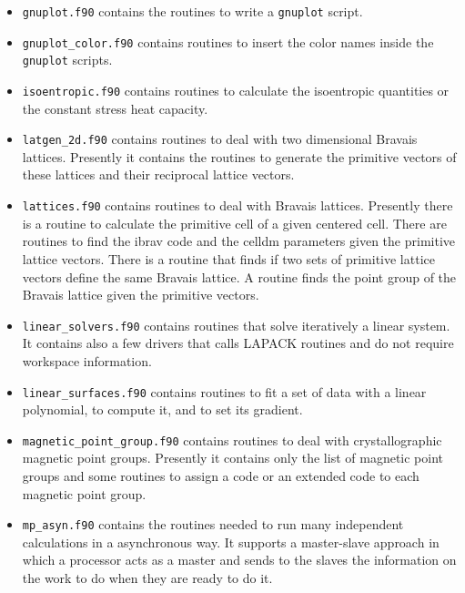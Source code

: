 \documentclass[12pt,a4paper]{article}
\begin{document}
\begin{itemize}
\item
\texttt{gnuplot.f90} contains the routines to write a \texttt{gnuplot} script.

\item
\texttt{gnuplot\_color.f90} contains routines to insert the color names
inside the \texttt{gnuplot} scripts.

\item
\texttt{isoentropic.f90} contains routines to calculate the isoentropic
quantities or the constant stress heat capacity.

\item
\texttt{latgen\_2d.f90} contains routines to deal with two dimensional
Bravais lattices. Presently it contains the routines to generate the
primitive vectors of these lattices and their reciprocal lattice vectors.

\item \texttt{lattices.f90} contains routines to deal with Bravais lattices.
Presently there is a routine to calculate the primitive cell of
a given centered cell. There are routines to find the ibrav code and the
celldm parameters given the primitive lattice vectors. There is a routine
that finds if two sets of primitive lattice vectors define the same 
Bravais lattice. A routine finds the point group of the Bravais lattice
given the primitive vectors.

\item
\texttt{linear\_solvers.f90} contains routines that solve iteratively
a linear system. It contains also a few drivers that calls LAPACK routines
and do not require workspace information. 

\item
\texttt{linear\_surfaces.f90} contains routines to fit a set of data
with a linear polynomial, to compute it, and to set its gradient.  

\item
\texttt{magnetic\_point\_group.f90} contains routines to deal with 
crystallographic
magnetic point groups. Presently it contains only the list of magnetic
point groups and some routines to assign a code or an extended code to each
magnetic point group.

\item
\texttt{mp\_asyn.f90} contains the routines needed to run many 
independent calculations in a asynchronous way. It supports a master-slave
approach in which a processor acts as a master and sends to the slaves
the information on the work to do when they are ready to do it.


\end{itemize}
\end{document}
